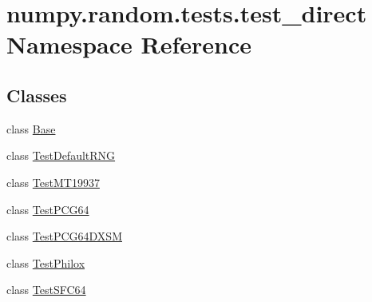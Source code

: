 \hypertarget{namespacenumpy_1_1random_1_1tests_1_1test__direct}{}\section{numpy.\+random.\+tests.\+test\+\_\+direct Namespace Reference}
\label{namespacenumpy_1_1random_1_1tests_1_1test__direct}
\subsection*{Classes}
\begin{DoxyCompactItemize}
\item 
class \hyperlink{classnumpy_1_1random_1_1tests_1_1test__direct_1_1Base}{Base}
\item 
class \hyperlink{classnumpy_1_1random_1_1tests_1_1test__direct_1_1TestDefaultRNG}{Test\+Default\+R\+NG}
\item 
class \hyperlink{classnumpy_1_1random_1_1tests_1_1test__direct_1_1TestMT19937}{Test\+M\+T19937}
\item 
class \hyperlink{classnumpy_1_1random_1_1tests_1_1test__direct_1_1TestPCG64}{Test\+P\+C\+G64}
\item 
class \hyperlink{classnumpy_1_1random_1_1tests_1_1test__direct_1_1TestPCG64DXSM}{Test\+P\+C\+G64\+D\+X\+SM}
\item 
class \hyperlink{classnumpy_1_1random_1_1tests_1_1test__direct_1_1TestPhilox}{Test\+Philox}
\item 
class \hyperlink{classnumpy_1_1random_1_1tests_1_1test__direct_1_1TestSFC64}{Test\+S\+F\+C64}
\end{DoxyCompactItemize}
